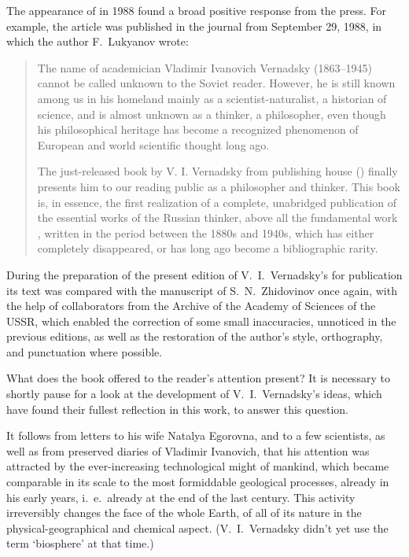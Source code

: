 The appearance of  in 1988 found a broad
positive response from the press.  For example, the article
 was published in the journal
 from September 29, 1988, in which the author
F.~Lukyanov wrote: \begin{quotation}
  The name of academician Vladimir Ivanovich Vernadsky (1863--1945) cannot be
  called unknown to the Soviet reader.  However, he is still known among us in
  his homeland mainly as a scientist-naturalist, a historian of science, and is
  almost unknown as a thinker, a philosopher, even though his philosophical
  heritage has become a recognized phenomenon of European and world scientific
  thought long ago.
  
  The just-released book by V. I. Vernadsky from publishing house 
  ()  finally presents him
  to our reading public as a philosopher and
  thinker.  This book is, in essence, the first realization of a complete,
  unabridged publication of the essential works of the Russian thinker, above
  all the fundamental work , written in the period between the 1880s and 1940s, which has
  either completely disappeared, or has long ago become a bibliographic rarity.
\end{quotation}

During the preparation of the present edition of V.~I.\ Vernadsky's
 for publication its text was compared
with the manuscript of S.~N.\ Zhidovinov once
again, with the help of collaborators from the Archive of the Academy of
Sciences of the USSR, which enabled the correction
of some small inaccuracies, unnoticed in the previous editions, as well as the
restoration of the author's style, orthography, and punctuation where possible.

What does the book offered to the reader's attention present?  It is necessary
to shortly pause for a look at the development of V.~I.\ Vernadsky's ideas,
which have found their fullest reflection in this work, to answer this
question.
\medskip

It follows from letters to his wife Natalya Egorovna, and to a few scientists, as well as from preserved diaries of
Vladimir Ivanovich, that his attention was attracted by the ever-increasing
technological might of mankind, which became comparable in its scale to the
most formiddable geological processes, already in his early years, i.~e.\
already at the end of the last century.  This activity irreversibly changes the
face of the whole Earth, of all of its nature in the physical-geographical and
chemical aspect.  (V.~I.\ Vernadsky didn't yet use the term `biosphere' at that
time.)

